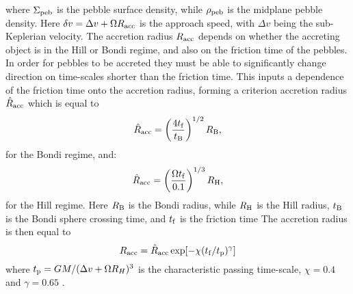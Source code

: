 \documentclass[a4paper,fleqn,usenatbib]{mnras}
\begin{document}
where $\Sigma_{\rm peb}$ is the pebble surface density, while $\rho_{\rm peb}$ is the midplane pebble density.
Here $\delta v = \Delta v + \Omega R_{\rm acc}$ is the approach speed, with $\Delta v$ being the sub-Keplerian velocity. 
The accretion radius $R_{\rm acc}$ depends on whether the accreting object is in the Hill or Bondi regime, and also on the friction time of the pebbles.
In order for pebbles to be accreted they must be able to significantly change direction on time-scales shorter than the friction time.
This inputs a dependence of the friction time onto the accretion radius, forming a criterion accretion radius $\hat{R}_{\rm acc}$ which is equal to 
\begin{equation}
 \hat{R}_{\rm acc} = \left( \frac{4 t_{\rm f}}{t_{\rm B}} \right)^{1/2} R_{\rm B},
\end{equation}
for the Bondi regime, and:
\begin{equation}
 \hat{R}_{\rm acc} = \left(  \frac{\Omega t_{\rm f}}{0.1} \right)^{1/3} R_{\rm H},
 \label{Racc_Hill}
\end{equation}
for the Hill regime.
Here $R_{\rm B}$ is the Bondi radius, while $R_{\rm H}$ is the Hill radius, $t_{\rm B}$ is the Bondi sphere crossing time, and $t_{\rm f}$ is the friction time
The accretion radius is then equal to
\begin{equation}
    R_{\rm acc} = \hat{R}_{\rm acc} \exp[-\chi(t_{\rm f}/t_{\rm p})^{\gamma}]
\end{equation}
where $t_{\rm p} = G M/(\Delta v + \Omega R_{H})^3$ is the characteristic passing time-scale, $\chi = 0.4$ and $\gamma = 0.65$ \citep{OrmelKlahr2010}.
\end{document}
